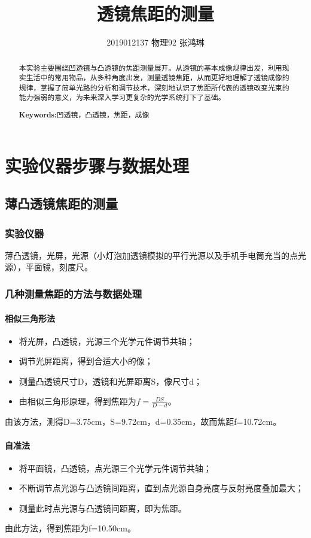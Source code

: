 \documentclass[UTF8]{ctexart}
\begin{document}
\title{透镜焦距的测量}
\author{2019012137  物理92  张鸿琳}
\maketitle
\begin{abstract}
本实验主要围绕凹透镜与凸透镜的焦距测量展开。从透镜的基本成像规律出发，利用现实生活中的常用物品，从多种角度出发，测量透镜焦距，从而更好地理解了透镜成像的规律，掌握了简单光路的分析和调节技术，深刻地认识了焦距所代表的透镜改变光束的能力强弱的意义，为未来深入学习更复杂的光学系统打下了基础。



\centering
\textbf{Keywords:}凹透镜，凸透镜，焦距，成像
\end{abstract}

\newpage
\tableofcontents
\newpage
\section{实验仪器步骤与数据处理}
\subsection{薄凸透镜焦距的测量}
\subsubsection{实验仪器}
薄凸透镜，光屏，光源（小灯泡加透镜模拟的平行光源以及手机手电筒充当的点光源），平面镜，刻度尺。
\subsubsection{几种测量焦距的方法与数据处理}
\paragraph{相似三角形法}
\begin{itemize}
\item 将光屏，凸透镜，光源三个光学元件调节共轴；
\item 调节光屏距离，得到合适大小的像；
\item 测量凸透镜尺寸D，透镜和光屏距离S，像尺寸d；
\item 由相似三角形原理，得到焦距为$f=\frac{DS}{D-d}$。
\end{itemize}
由该方法，测得D=3.75cm，S=9.72cm，d=0.35cm，故而焦距f=10.72cm。
\paragraph{自准法}
\begin{itemize}
\item 将平面镜，凸透镜，点光源三个光学元件调节共轴；
\item 不断调节点光源与凸透镜间距离，直到点光源自身亮度与反射亮度叠加最大；
\item 测量此时点光源与凸透镜间距离，即为焦距。
\end{itemize}
由此方法，得到焦距为f=10.50cm。
\end{document}
